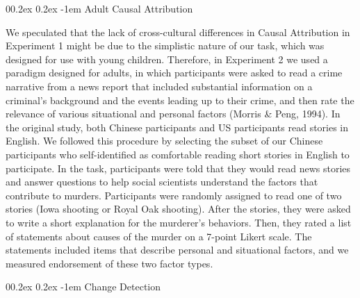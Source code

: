 \documentclass[
  man,floatsintext]{apa6}
\makeatletter
\let\oldparagraph\paragraph
\renewcommand{\paragraph}[1]{\oldparagraph{#1}\mbox{}}
\renewcommand{\paragraph}{\@startsection{paragraph}{4}{\parindent}%
  {0\baselineskip \@plus 0.2ex \@minus 0.2ex}%
  {-1em}%
  {\normalfont\normalsize\bfseries\itshape\typesectitle}}
\makeatother
\begin{document}
\hypertarget{adult-causal-attribution}{%
\paragraph{Adult Causal Attribution}\label{adult-causal-attribution}}

We speculated that the lack of cross-cultural differences in Causal Attribution in Experiment 1 might be due to the simplistic nature of our task, which was designed for use with young children. Therefore, in Experiment 2 we used a paradigm designed for adults, in which participants were asked to read a crime narrative from a news report that included substantial information on a criminal's background and the events leading up to their crime, and then rate the relevance of various situational and personal factors (Morris \& Peng, 1994). In the original study, both Chinese participants and US participants read stories in English. We followed this procedure by selecting the subset of our Chinese participants who self-identified as comfortable reading short stories in English to participate. In the task, participants were told that they would read news stories and answer questions to help social scientists understand the factors that contribute to murders. Participants were randomly assigned to read one of two stories (Iowa shooting or Royal Oak shooting). After the stories, they were asked to write a short explanation for the murderer's behaviors. Then, they rated a list of statements about causes of the murder on a 7-point Likert scale. The statements included items that describe personal and situational factors, and we measured endorsement of these two factor types.

\hypertarget{change-detection}{%
\paragraph{Change Detection}\label{change-detection}}
\end{document}
